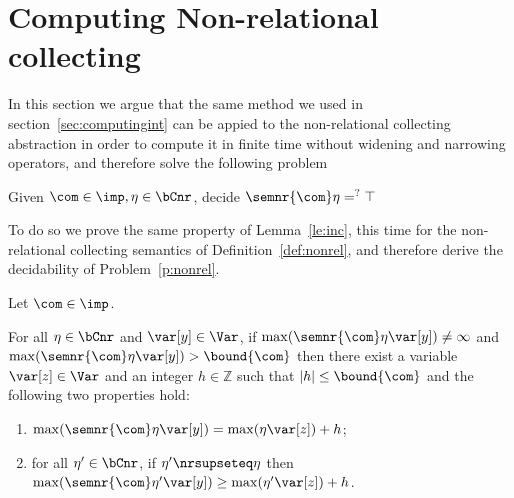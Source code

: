\section{Computing Non-relational collecting}
\label{sec:computingnonrel}

In this section we argue that the same method we used in
section~\ref{sec:computingint} can be appied to the non-relational
collecting abstraction in order to compute it in finite time without
widening and narrowing operators, and therefore solve the following
problem

\begin{problem}\label{p:nonrel}
  Given \(\com\in\imp, \eta \in \bCnr\), decide
  \(\semnr{\com}\eta =^? \top\)
\end{problem}

To do so we prove the same property of Lemma~\ref{le:inc}, this time
for the non-relational collecting semantics of
Definition~\ref{def:nonrel}, and therefore derive the decidability of
Problem~\ref{p:nonrel}.

\begin{lemma}
  \label{le:incnr}
  Let \(\com\in \imp\). %
    
  \noindent
  For all \(\eta \in \bCnr\) and \(\var[y] \in \Var\), if
  \(\max(\semnr{\com} \eta \var[y]) \neq \infty\) and
  \(\max(\semnr{\com}\eta \var[y]) > \bound{\com}\) then there exist a
  variable \(\var[z] \in \Var\) and an integer \(h \in \mathbb{Z}\)
  such that \(|h| \leq \bound{\com}\) and the following two properties
  hold:
  \begin{enumerate}[label=(\roman*)]
  \item \(\max(\semnr{\com}\eta \var[y]) = \max(\eta \var[z]) + h\); \label{point1nr}
  \item  for all \(\eta' \in \bCnr\), if \(\eta' \nrsupseteq \eta\)
    then
    \(\max(\semnr{\com}\eta' \var[y]) \geq \max(\eta' \var[z]) + h\). \label{point2nr}
  \end{enumerate}
\end{lemma}

